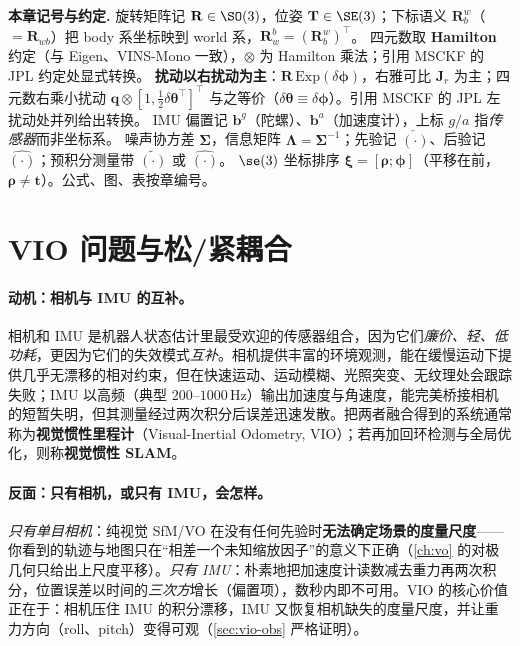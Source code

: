 \begin{note}
\textbf{本章记号与约定.}\;
旋转矩阵记 $\mathbf{R}\in\SO(3)$，位姿 $\mathbf{T}\in\SE(3)$；下标语义 $\mathbf{R}^w_b$（$=\mathbf{R}_{wb}$）把 body 系坐标映到 world 系，$\mathbf{R}^b_w=(\mathbf{R}^w_b)^\top$。
四元数取 \textbf{Hamilton} 约定（与 Eigen、VINS-Mono 一致），$\otimes$ 为 Hamilton 乘法；引用 MSCKF 的 JPL 约定处显式转换。
\textbf{扰动以右扰动为主}：$\mathbf{R}\,\mathrm{Exp}(\delta\boldsymbol{\phi})$，右雅可比 $\mathbf{J}_r$ 为主；四元数右乘小扰动 $\mathbf{q}\otimes[1,\tfrac12\delta\boldsymbol{\theta}^\top]^\top$ 与之等价（$\delta\boldsymbol{\theta}\equiv\delta\boldsymbol{\phi}$）。引用 MSCKF 的 JPL 左扰动处并列给出转换。
IMU 偏置记 $\mathbf{b}^g$（陀螺）、$\mathbf{b}^a$（加速度计），上标 $g/a$ 指\emph{传感器}而非坐标系。
噪声协方差 $\boldsymbol{\Sigma}$，信息矩阵 $\boldsymbol{\Lambda}=\boldsymbol{\Sigma}^{-1}$；先验记 $\check{(\cdot)}$、后验记 $\hat{(\cdot)}$；预积分测量带 $\tilde{(\cdot)}$ 或 $\hat{(\cdot)}$。
$\se(3)$ 坐标排序 $\boldsymbol{\xi}=[\boldsymbol{\rho};\boldsymbol{\phi}]$（平移在前，$\boldsymbol{\rho}\neq\mathbf{t}$）。公式、图、表按章编号。
\end{note}

\section{VIO 问题与松/紧耦合}
\label{sec:vio-problem}

\paragraph{动机：相机与 IMU 的互补。}
相机和 IMU 是机器人状态估计里最受欢迎的传感器组合，因为它们\emph{廉价、轻、低功耗}，更因为它们的失效模式\emph{互补}\cite{carlone2026handbook,qin2018vins}。相机提供丰富的环境观测，能在缓慢运动下提供几乎无漂移的相对约束，但在快速运动、运动模糊、光照突变、无纹理处会跟踪失败；IMU 以高频（典型 $200$--$1000\,$Hz）输出加速度与角速度，能完美桥接相机的短暂失明，但其测量经过两次积分后误差迅速发散。把两者融合得到的系统通常称为\textbf{视觉惯性里程计}（Visual-Inertial Odometry, VIO）；若再加回环检测与全局优化，则称\textbf{视觉惯性 SLAM}。

\paragraph{反面：只有相机，或只有 IMU，会怎样。}
\emph{只有单目相机}：纯视觉 SfM/VO 在没有任何先验时\textbf{无法确定场景的度量尺度}——你看到的轨迹与地图只在“相差一个未知缩放因子”的意义下正确（\cref{ch:vo} 的对极几何只给出上尺度平移）。\emph{只有 IMU}：朴素地把加速度计读数减去重力再两次积分，位置误差以时间的\emph{三次方}增长（偏置项），数秒内即不可用。VIO 的核心价值正在于：相机压住 IMU 的积分漂移，IMU 又恢复相机缺失的度量尺度，并让重力方向（roll、pitch）变得可观（\cref{sec:vio-obs} 严格证明）。

